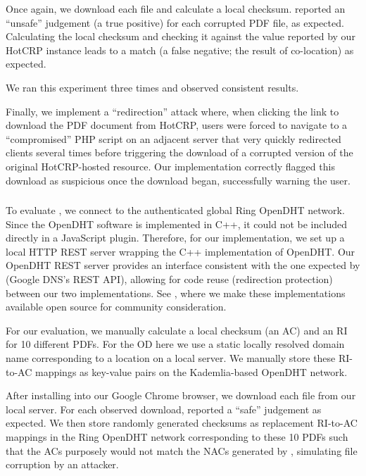 Once again, we download each file and calculate a local checksum. \DNSSYS{}
reported an ``unsafe'' judgement (a true positive) for each corrupted PDF file,
as expected. Calculating the local checksum and checking it against the value
reported by our HotCRP instance leads to a match (a false negative; \ie the
result of co-location) as expected.

We ran this experiment three times and observed consistent results.

Finally, we implement a ``redirection'' attack where, when clicking the link
to download the PDF document from HotCRP, users were forced to navigate to a
``compromised'' PHP script on an adjacent server that very quickly redirected
clients several times before triggering the download of a corrupted version of
the original HotCRP-hosted resource. Our implementation correctly flagged this
download as suspicious once the download began, successfully warning the user.

\subsubsection{\DHTSYS{}}

To evaluate \DHTSYS{}, we connect to the authenticated global Ring OpenDHT
network. Since the OpenDHT software is implemented in C++, it could not be
included directly in a JavaScript plugin. Therefore, for our implementation, we set up a local HTTP REST server wrapping the C++
implementation of OpenDHT. Our OpenDHT REST server provides an interface
consistent with the one expected by \DNSSYS{} (\ie Google DNS's REST API),
allowing for code reuse (\eg redirection protection) between our two
implementations. See , where we make these implementations
available open source for community consideration.

For our evaluation, we manually calculate a local checksum (\ie an AC) and an
RI for 10 different \CONFERENCE{} PDFs. For the OD here we use a static locally
resolved domain name corresponding to a location on a local server. We manually
store these RI-to-AC mappings as key-value pairs on the Kademlia-based OpenDHT
network.

After installing \DHTSYS{} into our Google Chrome browser, we download each
file from our local server. For each observed download, \DHTSYS{} reported a
``safe'' judgement as expected. We then store randomly generated checksums as
replacement RI-to-AC mappings in the Ring OpenDHT network corresponding to these
10 PDFs such that the ACs purposely would not match the NACs generated by
\DHTSYS{}, simulating file corruption by an attacker.

